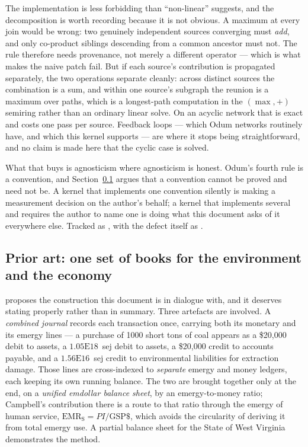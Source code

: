\documentclass[11pt,a4paper]{article}
\begin{document}
The implementation is less forbidding than ``non-linear'' suggests, and the decomposition is worth recording because it is not obvious. A maximum at every join would be wrong: two genuinely independent sources converging must \emph{add}, and only co-product siblings descending from a common ancestor must not. The rule therefore needs provenance, not merely a different operator --- which is what makes the naive patch fail. But if each source's contribution is propagated separately, the two operations separate cleanly: across distinct sources the combination is a sum, and within one source's subgraph the reunion is a maximum over paths, which is a longest-path computation in the $(\max, +)$ semiring rather than an ordinary linear solve. On an acyclic network that is exact and costs one pass per source. Feedback loops --- which Odum networks routinely have, and which this kernel supports --- are where it stops being straightforward, and no claim is made here that the cyclic case is solved.

What that buys is agnosticism where agnosticism is honest. Odum's fourth rule is a convention, and Section~\ref{sec:campbell} argues that a convention cannot be proved and need not be. A kernel that implements one convention silently is making a measurement decision on the author's behalf; a kernel that implements several and requires the author to name one is doing what this document asks of it everywhere else. Tracked as , with the defect itself as .


\subsection{Prior art: one set of books for the environment and the economy}
\label{sec:campbell}

\citet{campbell_Keeping_2013} proposes the construction this document is in dialogue with, and it deserves stating properly rather than in summary. Three artefacts are involved. A \emph{combined journal} records each transaction once, carrying both its monetary and its emergy lines --- a purchase of 1000 short tons of coal appears as a \$20{,}000 debit to assets, a $1.05\mathrm{E}18$~sej debit to assets, a \$20{,}000 credit to accounts payable, and a $1.56\mathrm{E}16$~sej credit to environmental liabilities for extraction damage. Those lines are cross-indexed to \emph{separate} emergy and money ledgers, each keeping its own running balance. The two are brought together only at the end, on a \emph{unified emdollar balance sheet}, by an emergy-to-money ratio; Campbell's contribution there is a route to that ratio through the emergy of human service, $\mathrm{EMR_S} = PI/\mathrm{GSP\$}$, which avoids the circularity of deriving it from total emergy use. A partial balance sheet for the State of West Virginia demonstrates the method.
\end{document}
